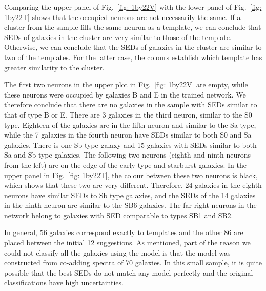             Comparing the upper panel of Fig.~\ref{fig: 1by22V} with the lower panel of Fig.~\ref{fig: 1by22T} shows that the occupied neurons are not necessarily the same.
            If a cluster from the  sample fills the same neuron as a  template, we can conclude that SEDs of galaxies in the cluster are very similar to those of the template.
            Otherwise, we can conclude that the SEDs of galaxies in the cluster are similar to two of the  templates.
            For the latter case, the colours establish which template has greater similarity to the  cluster.
            
            The first two neurons in the upper plot in Fig.~\ref{fig: 1by22V} are empty, while these neurons were occupied by galaxies B and E in the trained network.
            We therefore conclude that there are no galaxies in the  sample with SEDs similar to that of type B or E.
            There are 3 galaxies in the third neuron, similar to the S0 type. 
            Eighteen of the galaxies are in the fifth neuron and similar to the Sa type, while the 7 galaxies in the fourth neuron have SEDs similar to both S0 and Sa galaxies.
            There is one Sb type galaxy and 15 galaxies with SEDs similar to both Sa and Sb type galaxies.
            The following two neurons (eighth and ninth neurons from the left) are on the edge of the early type and starburst galaxies.
            In the upper panel in Fig.~\ref{fig: 1by22T}, the colour between these two neurons is black, which shows that these two are very different.
            Therefore, 24 galaxies in the eighth neurons have similar SEDs to Sb type galaxies, and the SEDs of the 14 galaxies in the ninth neuron are similar to the SB6 galaxies.
            The far right neurons in the network belong to galaxies with SED comparable to types SB1 and SB2.
            
            In general, 56 galaxies correspond exactly to  templates and the other 86 are placed between the initial 12 suggestions.
            As  mentioned, part of the reason we could not classify all the galaxies using the  model is that the model was constructed from co-adding spectra of 70 galaxies.
            In this small sample, it is quite possible that the best SEDs do not match any model perfectly and the original classifications have high uncertainties.
            
